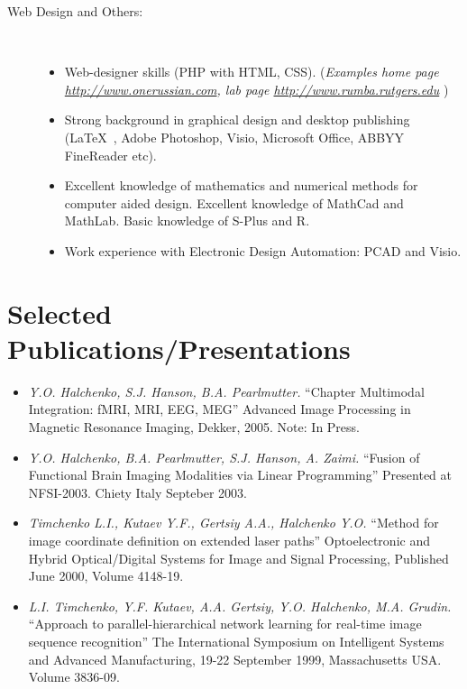 \documentclass[10pt,overlapped,line]{res}
\newcommand{\wdescription}[1]{({\small \textit{#1}})}
\newcommand{\mtitle}[1]{``#1''}
\newcommand{\mauthors}[1]{ \textit{#1.}}
\newcommand{\mwhere}[1]{#1.}
\begin{document}
\begin{resume}
\begin{description}
    \item[Web Design and Others:]  \hspace*{\fill} \\
      \begin{itemize}
      \item Web-designer skills (PHP with HTML, CSS).
        \wdescription{Examples
   home page \href{URL}{http://www.onerussian.com},
   lab page \href{URL}{http://www.rumba.rutgers.edu}
}
      \item Strong background in graphical design and desktop
        publishing (\LaTeX\ , Adobe Photoshop, Visio, Microsoft Office, ABBYY
        FineReader etc).
      \item Excellent knowledge of mathematics and numerical methods
        for computer aided design. Excellent knowledge of MathCad and
        MathLab. Basic knowledge of S-Plus and R.
      \item Work experience with Electronic Design Automation: PCAD and
        Visio.
      \end{itemize}
  \end{description}

 \section{Selected Publications/Presentations}

 \begin{itemize}
  \item
    \mauthors{Y.O. Halchenko, S.J. Hanson,  B.A. Pearlmutter}
    \mtitle{Chapter Multimodal Integration: fMRI, MRI, EEG, MEG}
    \mwhere{Advanced Image Processing in Magnetic Resonance Imaging, Dekker, 2005. Note: In Press}

  \item
     \mauthors{Y.O. Halchenko, B.A. Pearlmutter, S.J. Hanson, A. Zaimi}
     \mtitle{Fusion of Functional Brain Imaging Modalities via Linear Programming}
     \mwhere{Presented at NFSI-2003. Chiety Italy Septeber 2003}

  \item
     \mauthors{Timchenko L.I., Kutaev Y.F., Gertsiy A.A., Halchenko Y.O}
     \mtitle{Method for image coordinate definition on extended laser paths}
     \mwhere{Optoelectronic and Hybrid Optical/Digital Systems for Image and Signal Processing, Published June 2000,  Volume 4148-19}

  \item
     \mauthors{L.I. Timchenko, Y.F. Kutaev, A.A. Gertsiy, Y.O. Halchenko,
     M.A. Grudin}
     \mtitle{Approach to parallel-hierarchical network learning for real-time image sequence recognition}
     \mwhere{The International Symposium on Intelligent Systems and Advanced Manufacturing, 19-22 September 1999, Massachusetts USA. Volume 3836-09}


\end{itemize}
\end{resume}
\end{document}
